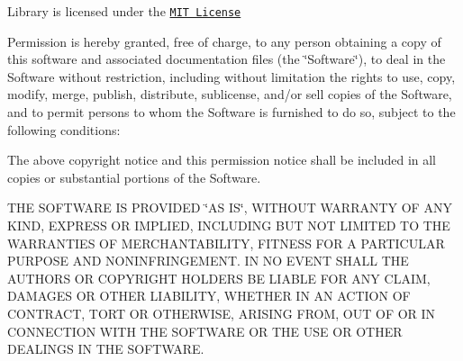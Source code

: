 Library is licensed under the \href{https://opensource.org/licenses/MIT}{\tt M\+IT License}

Permission is hereby granted, free of charge, to any person obtaining a copy of this software and associated documentation files (the \char`\"{}\+Software\char`\"{}), to deal in the Software without restriction, including without limitation the rights to use, copy, modify, merge, publish, distribute, sublicense, and/or sell copies of the Software, and to permit persons to whom the Software is furnished to do so, subject to the following conditions\+:

The above copyright notice and this permission notice shall be included in all copies or substantial portions of the Software.

T\+HE S\+O\+F\+T\+W\+A\+RE IS P\+R\+O\+V\+I\+D\+ED \char`\"{}\+A\+S I\+S\char`\"{}, W\+I\+T\+H\+O\+UT W\+A\+R\+R\+A\+N\+TY OF A\+NY K\+I\+ND, E\+X\+P\+R\+E\+SS OR I\+M\+P\+L\+I\+ED, I\+N\+C\+L\+U\+D\+I\+NG B\+UT N\+OT L\+I\+M\+I\+T\+ED TO T\+HE W\+A\+R\+R\+A\+N\+T\+I\+ES OF M\+E\+R\+C\+H\+A\+N\+T\+A\+B\+I\+L\+I\+TY, F\+I\+T\+N\+E\+SS F\+OR A P\+A\+R\+T\+I\+C\+U\+L\+AR P\+U\+R\+P\+O\+SE A\+ND N\+O\+N\+I\+N\+F\+R\+I\+N\+G\+E\+M\+E\+NT. IN NO E\+V\+E\+NT S\+H\+A\+LL T\+HE A\+U\+T\+H\+O\+RS OR C\+O\+P\+Y\+R\+I\+G\+HT H\+O\+L\+D\+E\+RS BE L\+I\+A\+B\+LE F\+OR A\+NY C\+L\+A\+IM, D\+A\+M\+A\+G\+ES OR O\+T\+H\+ER L\+I\+A\+B\+I\+L\+I\+TY, W\+H\+E\+T\+H\+ER IN AN A\+C\+T\+I\+ON OF C\+O\+N\+T\+R\+A\+CT, T\+O\+RT OR O\+T\+H\+E\+R\+W\+I\+SE, A\+R\+I\+S\+I\+NG F\+R\+OM, O\+UT OF OR IN C\+O\+N\+N\+E\+C\+T\+I\+ON W\+I\+TH T\+HE S\+O\+F\+T\+W\+A\+RE OR T\+HE U\+SE OR O\+T\+H\+ER D\+E\+A\+L\+I\+N\+GS IN T\+HE S\+O\+F\+T\+W\+A\+RE. 